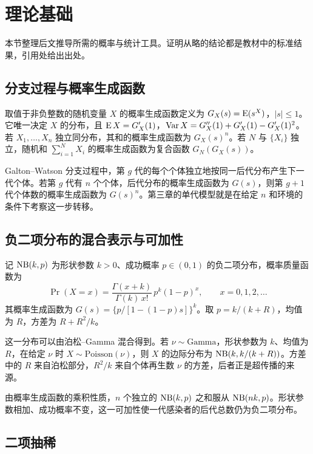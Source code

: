 \section{理论基础}
\label{sec:lit-tools}

本节整理后文推导所需的概率与统计工具。证明从略的结论都是教材中的标准结果，引用处给出出处。

\subsection{分支过程与概率生成函数}

取值于非负整数的随机变量 $X$ 的概率生成函数定义为 $G_X(s)=\operatorname{E}(s^X)$，$|s|\le1$。它唯一决定 $X$ 的分布，且 $\operatorname{E} X=G_X'(1)$，$\operatorname{Var} X=G_X''(1)+G_X'(1)-G_X'(1)^2$。若 $X_1,\dots,X_n$ 独立同分布，其和的概率生成函数为 $G_X(s)^n$。若 $N$ 与 $\{X_i\}$ 独立，随机和 $\sum_{i=1}^N X_i$ 的概率生成函数为复合函数 $G_N(G_X(s))$。

Galton--Watson 分支过程中，第 $g$ 代的每个个体独立地按同一后代分布产生下一代个体\citep{harris1963theory, athreya1972branching}。若第 $g$ 代有 $n$ 个个体，后代分布的概率生成函数为 $G(s)$，则第 $g+1$ 代个体数的概率生成函数为 $G(s)^n$。第三章的单代模型就是在给定 $n$ 和环境的条件下考察这一步转移。

\subsection{负二项分布的混合表示与可加性}

记 $\operatorname{NB}(k,p)$ 为形状参数 $k>0$、成功概率 $p\in(0,1)$ 的负二项分布，概率质量函数为
\begin{equation}
  \Pr(X=x)=\frac{\Gamma(x+k)}{\Gamma(k)\,x!}\,p^{k}(1-p)^{x},\qquad x=0,1,2,\dots
  \label{eq:nb-pmf}
\end{equation}
其概率生成函数为 $G(s)=\{p/[1-(1-p)s]\}^{k}$。取 $p=k/(k+R)$，均值为 $R$，方差为 $R+R^2/k$。

这一分布可以由泊松--Gamma 混合得到。若 $\nu\sim\mathrm{Gamma}$，形状参数为 $k$、均值为 $R$，在给定 $\nu$ 时 $X\sim\mathrm{Poisson}(\nu)$，则 $X$ 的边际分布为 $\operatorname{NB}(k,k/(k+R))$\citep{lloydsmith2005superspreading, cameron2013regression}。方差中的 $R$ 来自泊松部分，$R^2/k$ 来自个体再生数 $\nu$ 的方差，后者正是超传播的来源。

由概率生成函数的乘积性质，$n$ 个独立的 $\operatorname{NB}(k,p)$ 之和服从 $\operatorname{NB}(nk,p)$。形状参数相加、成功概率不变，这一可加性使一代感染者的后代总数仍为负二项分布。

\subsection{二项抽稀}


